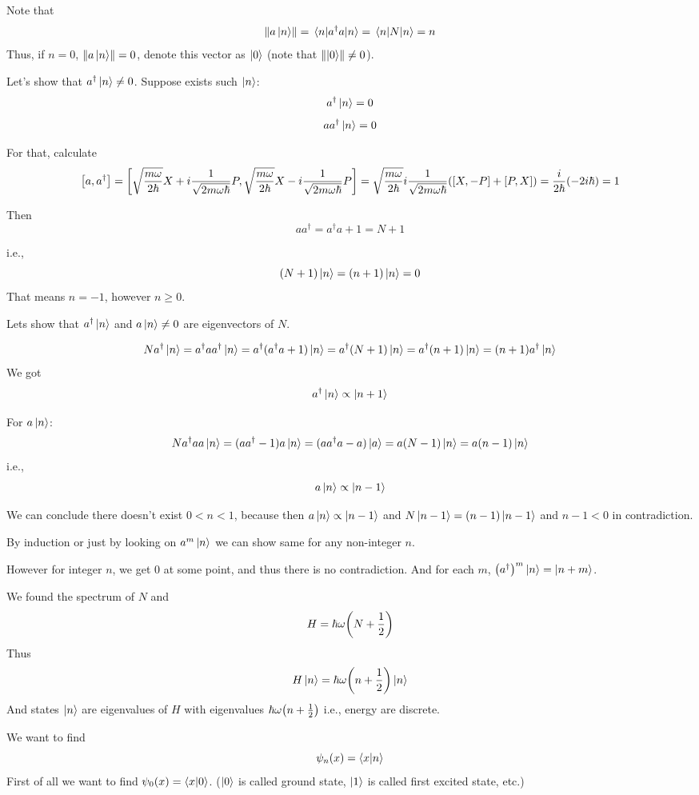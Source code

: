 Note that
$$\norm{a\ket{n}} =\mel{n}{a^\dagger a}{n} = \mel{n}{N}{n} = n$$
Thus, if $n=0$, $\norm{a\ket{n}} = 0$, denote this vector as $\ket{0}$ (note that $\norm{\ket{0}}\neq0 $).

Let's show that $a^\dagger \ket{n} \neq 0$. Suppose  exists such $\ket{n}$: 
$$a^\dagger \ket{n} = 0$$
$$aa^\dagger  \ket{n} = 0$$

For that, calculate
$$\comm{a}{ a^\dagger} = \comm{\sqrt{\frac{m\omega}{2\hbar}} X +i\frac{1}{\sqrt{2m\omega\hbar}} P}{ \sqrt{\frac{m\omega}{2\hbar}} X -i\frac{1}{\sqrt{2m\omega\hbar}} P} = \sqrt{\frac{m\omega}{2\hbar}}i\frac{1}{\sqrt{2m\omega\hbar}} \qty( \comm{X}{-P}+\comm{P}{X}) = \frac{i}{2\hbar} (-2i\hbar) = 1$$


Then
$$aa^\dagger = a^\dagger a + 1 = N+1$$

i.e.,
$$(N+1)\ket{n} = (n+1)\ket{n} = 0$$
That means $n=-1$, however $n\geq 0 $.

Lets show that $a^\dagger \ket{n}$ and $a \ket{n} \neq 0 $ are eigenvectors of $N$.

$$Na^\dagger \ket{n} = a^\dagger a a^\dagger \ket{n} = a^\dagger (a^\dagger a+1)\ket{n} = a^\dagger (N+1)\ket{n}= a^\dagger(n+1)\ket{n} = (n+1)a^\dagger \ket{n}$$
We got
$$a^\dagger \ket{n}\propto \ket{n+1}$$

For $a\ket{n}$:
$$Na^\dagger a a \ket{n} = (aa^\dagger -1) a \ket{n} = (aa^\dagger a - a)\ket{a} = a(N-1)\ket{n}= a(n-1)\ket{n} $$
i.e.,
$$a\ket{n} \propto \ket{n-1}$$

We can conclude there doesn't exist $0<n<1$, because then $a\ket{n} \propto \ket{n-1}$ and $N\ket{n-1} = (n-1)\ket{n-1}$ and $n-1<0$ in contradiction.

By induction or just by looking on $a^m\ket{n}$ we can show same for any non-integer $n$.

However for integer $n$, we get 0 at some point, and thus there is no contradiction. And for each $m$, $\qty(a^\dagger)^m \ket{n} = \ket{n+m}$.

We found the spectrum of $N$ and
$$H = \hbar \omega \qty(N+\frac{1}{2})$$
Thus
$$H\ket{n} = \hbar \omega \qty(n+\frac{1}{2})\ket{n}$$
And states $\ket{n}$ are eigenvalues of $H$ with eigenvalues $\hbar \omega \qty(n+\frac{1}{2})$ i.e., energy are discrete.

We want to find
$$\psi_n(x) = \braket{x}{n}$$
First of all we want to find $\psi_0(x) = \braket{x}{0}$. ($\ket{0}$ is called ground state, $\ket{1}$ is called first excited state, etc.)

